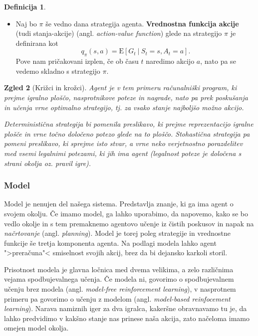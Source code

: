 \documentclass[12pt,a4paper]{amsart}
\theoremstyle{definition} %
\newtheorem{definicija}{Definicija}[section]
\theoremstyle{plain} %
\newtheorem{zgled}[definicija]{Zgled}
\begin{document}
\begin{definicija}
\begin{itemize}
        \item Naj bo $\pi$ še vedno dana strategija agenta. \textbf{Vrednostna funkcija 
                akcije} (tudi stanja-akcije) (angl. \textit{action-value function}) glede na 
                strategijo $\pi$ je definirana kot
                $$
                q_\pi(s, a) = \mathrm{E} [G_t~|~S_t = s, A_t = a].
                $$
                Pove nam pričakovani izplen, če ob času $t$ naredimo akcijo $a$, nato pa se 
                vedemo skladno s strategijo $\pi$.
    \end{itemize}
\end{definicija}

\begin{zgled}[Križci in krožci]
    Agent je v tem primeru računalniški program, ki prejme igralno ploščo, nasprotnikove 
    poteze in nagrade, nato pa prek poskušanja in učenja vrne optimalno strategijo, tj. 
    za vsako stanje najboljšo možno akcijo.

    Deterministična strategija bi pomenila preslikavo, ki prejme reprezentacijo igralne plošče
    in vrne točno določeno potezo glede na to ploščo. Stohastična strategija pa pomeni preslikavo, 
    ki sprejme isto stvar, a vrne neko verjetnostno porazdelitev med vsemi legalnimi potezami, 
    ki jih ima agent (legalnost poteze je določena s strani okolja oz. pravil igre).
\end{zgled}

\subsubsection{Model}
Model je nenujen del našega sistema. Predstavlja znanje, ki ga ima agent o svojem okolju. 
Če imamo model, ga lahko uporabimo, da napovemo, kako se bo vedlo okolje in s tem premaknemo
agentovo učenje iz čistih poskusov in napak na \textit{načrtovanje} (angl. \textit{planning}).
Model je torej poleg strategije in vrednostne funkcije še tretja komponenta agenta. Na podlagi 
modela lahko agent ">preračuna"< smiselnost svojih akcij, brez da bi dejansko karkoli storil. 

Prisotnost modela je glavna ločnica med dvema velikima, a zelo različnima vejama spodbujevalnega
učenja. Če modela ni, govorimo o spodbujevalnem učenju brez modela (angl. \textit{model-free 
reinforcement learning}), v nasprotnem primeru pa govorimo o učenju z modelom (angl. \textit
{model-based reinfocement learning}). Narava namiznih iger za dva igralca, kakeršne obravnavamo tu
je, da lahko predvidimo v kakšno stanje nas prinese naša akcija, zato načeloma imamo omejen model 
okolja.
\end{document}
